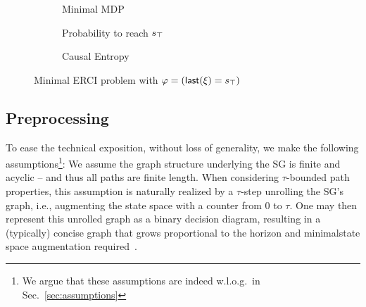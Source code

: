 {{{\begin{figure}
\centering
\begin{subfigure}{0.2\columnwidth}
\centering
{}
\caption{Minimal MDP}
\label{fig:minimal:mdp}
\end{subfigure}
\begin{subfigure}{0.38\columnwidth}
\centering
{}
\caption{Probability to reach $s_{\top}$}
\label{fig:minimal:soft}
\end{subfigure}
\begin{subfigure}{0.38\columnwidth}
\centering
{}
\caption{Causal Entropy}
\label{fig:minimal:entropy}
\end{subfigure}

\caption{Minimal ERCI problem with $\varphi = ( \mathsf{last}({\xi}) = s_{\top} )$}
\end{figure}


\subsection{Preprocessing}
To ease the technical exposition, without loss of generality, we make
the following assumptions\footnote{We argue that these assumptions are
indeed w.l.o.g.\ in Sec.~\ref{sec:assumptions}}: We assume the graph
structure underlying the SG is finite and acyclic -- and thus all paths
are finite length. When considering $\tau$-bounded path properties,
this assumption is naturally realized by a $\tau$-step unrolling the
SG's graph, i.e., augmenting the state space with a counter from $0$ to $\tau$.
One may then represent this unrolled graph as a binary
decision diagram, resulting in a (typically) concise graph that grows
proportional to the horizon and minimal\footnotemark state space augmentation
required~\cite{DBLP:conf/cav/Vazquez-Chanlatte20}.

}}}
